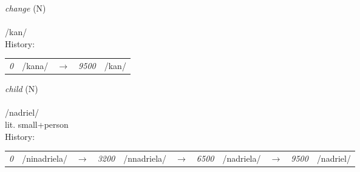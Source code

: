 \vspace{15pt}
\begin{nopagebreak}
 \textit{change} (N)\\
\\
\noindent /k{\textprimstress}an/\\


\noindent History:

\vspace{-0pt}
\hspace{40pt}
\begin{tabular}{ccc}
\textit{0} & /kana/&$\rightarrow$ & \textit{9500} & /kan/& \\
\end{tabular}

\vspace{20pt}\hline

\end{nopagebreak}
\filbreak



\vspace{15pt}
\begin{nopagebreak}
 \textit{child} (N)\\
\\
\noindent /nadr{\textprimstress}iel/\\
\noindent lit. small+person\\


\noindent History:

\vspace{-0pt}
\hspace{40pt}
\begin{tabular}{ccc}
\textit{0} & /ninadriela/&$\rightarrow$ & \textit{3200} & /nnadriela/&$\rightarrow$ & \textit{6500} & /nadriela/&$\rightarrow$ & \textit{9500} & /nadriel/& \\
\end{tabular}

\vspace{20pt}\hline

\end{nopagebreak}
\filbreak



